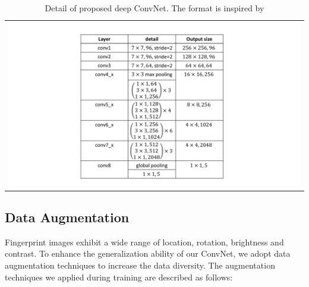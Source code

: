 \begin{table}[!ht]
	\centering
	\caption{Detail of proposed deep ConvNet. The format is inspired by \cite{he2016deep}}
	\label{tab.cnn_params}
	\begin{tabular}{l}
		\includegraphics[scale=0.45,clip=true,trim = 78mm 5mm 70mm 5mm]{fig/figs/cnn_table.pdf}
	\end{tabular}
\end{table}

\subsection{Data Augmentation}
\label{sec-dataAug}
Fingerprint images exhibit a wide range of location, rotation, brightness and contrast. To enhance the generalization ability of our ConvNet, we adopt data augmentation techniques to increase the data diversity. 
The augmentation techniques we applied during training are described as follows:

